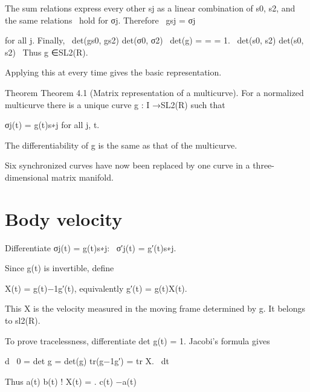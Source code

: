 \begin{displaytext}
The sum relations express every other sj as a linear combination of s0, s2, and the same relations \
hold for σj. Therefore \
gsj = σj
\end{displaytext}

\begin{displaytext}
for all j. Finally, \
det(gs0, gs2) det(σ0, σ2) \
det(g) = = = 1. \
det(s0, s2) det(s0, s2) \
Thus g ∈SL2(R).
\end{displaytext}

Applying this at every time gives the basic representation.


\begin{statementbox}{Theorem}
Theorem 4.1 (Matrix representation of a multicurve). For a normalized multicurve there is a unique curve g : I →SL2(R) such that
\end{statementbox}

\begin{displaytext}
σj(t) = g(t)s∗j for all j, t.
\end{displaytext}

The differentiability of g is the same as that of the multicurve.


Six synchronized curves have now been replaced by one curve in a three-dimensional matrix manifold.


\section{Body velocity}

\begin{displaytext}
Differentiate σj(t) = g(t)s∗j: \
σ′j(t) = g′(t)s∗j.
\end{displaytext}

Since g(t) is invertible, define


\begin{displaytext}
X(t) = g(t)−1g′(t), equivalently g′(t) = g(t)X(t).
\end{displaytext}

This X is the velocity measured in the moving frame determined by g. It belongs to sl2(R).


To prove tracelessness, differentiate det g(t) = 1. Jacobi’s formula gives


\begin{displaytext}
d \
0 = det g = det(g) tr(g−1g′) = tr X. \
dt
\end{displaytext}

Thus a(t) b(t) ! X(t) = . c(t) −a(t)


